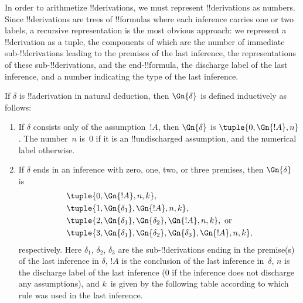 \documentclass[../../../include/open-logic-section]{subfiles}
\begin{document}

\begin{explain}
In order to arithmetize !!{derivation}s, we must represent
!!{derivation}s as numbers. Since !!{derivation}s are trees of
!!{formula}s where each inference carries one or two labels, a
recursive representation is the most obvious approach: we represent a
!!{derivation} as a tuple, the components of which are the number of
immediate sub-!!{derivation}s leading to the premises of the last
inference, the representations of these sub-!!{derivation}s, and the
end-!!{formula}, the discharge label of the last inference, and a
number indicating the type of the last inference.
\end{explain}

\begin{defn}
  If $\delta$ is !!a{derivation} in natural deduction, then $\Gn{\delta}$ is
  defined inductively as follows:
  \begin{enumerate}
  \item 
    If $\delta$ consists only of the assumption~$!A$, then $\Gn{\delta}$
    is $\tuple{0, \Gn{!A}, n}$. The number~$n$ is~$0$ if it is an
    !!{undischarged} assumption, and the numerical label otherwise.
  \item 
    If $\delta$ ends in an inference with zero, one, two, or three premises,
    then $\Gn{\delta}$ is
    \begin{align*}
      & \tuple{0, \Gn{!A}, n, k}, \\
      & \tuple{1, \Gn{\delta_1}, \Gn{!A}, n, k}, \\
      & \tuple{2, \Gn{\delta_1}, \Gn{\delta_2}, \Gn{!A}, n, k}, \text{ or}\\
      & \tuple{3, \Gn{\delta_1}, \Gn{\delta_2}, \Gn{\delta_3}, \Gn{!A}, n,
        k},
    \end{align*}
    respectively.  Here $\delta_1$, $\delta_2$, $\delta_3$ are the
    sub-!!{derivation}s ending in the premise(s) of the last inference
    in $\delta$, $!A$ is the conclusion of the last inference
    in~$\delta$, $n$ is the discharge label of the last inference ($0$
    if the inference does not discharge any assumptions), and $k$~is
    given by the following table according to which rule was used in the
    last inference.
  

\end{enumerate}
\end{defn}
\end{document}
